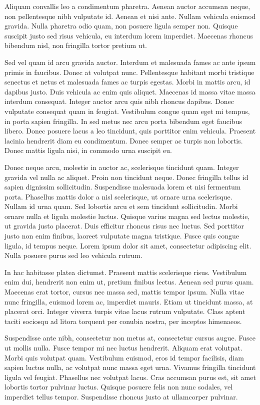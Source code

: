 Aliquam convallis leo a condimentum pharetra. Aenean auctor accumsan neque, non pellentesque nibh vulputate id. Aenean et nisi ante. Nullam vehicula euismod gravida. Nulla pharetra odio quam, non posuere ligula semper non. Quisque suscipit justo sed risus vehicula, eu interdum lorem imperdiet. Maecenas rhoncus bibendum nisl, non fringilla tortor pretium ut.

Sed vel quam id arcu gravida auctor. Interdum et malesuada fames ac ante ipsum primis in faucibus. Donec at volutpat nunc. Pellentesque habitant morbi tristique senectus et netus et malesuada fames ac turpis egestas. Morbi in mattis arcu, id dapibus justo. Duis vehicula ac enim quis aliquet. Maecenas id massa vitae massa interdum consequat. Integer auctor arcu quis nibh rhoncus dapibus. Donec vulputate consequat quam in feugiat. Vestibulum congue quam eget mi tempus, in porta sapien fringilla. In sed metus nec arcu porta bibendum eget faucibus libero. Donec posuere lacus a leo tincidunt, quis porttitor enim vehicula. Praesent lacinia hendrerit diam eu condimentum. Donec semper ac turpis non lobortis. Donec mattis ligula nisi, in commodo urna suscipit eu.

Donec neque arcu, molestie in auctor ac, scelerisque tincidunt quam. Integer gravida vel nulla ac aliquet. Proin non tincidunt neque. Donec fringilla tellus id sapien dignissim sollicitudin. Suspendisse malesuada lorem et nisi fermentum porta. Phasellus mattis dolor a nisl scelerisque, ut ornare urna scelerisque. Nullam id urna quam. Sed lobortis arcu et sem tincidunt sollicitudin. Morbi ornare nulla et ligula molestie luctus. Quisque varius magna sed lectus molestie, ut gravida justo placerat. Duis efficitur rhoncus risus nec luctus. Sed porttitor justo non enim finibus, laoreet vulputate magna tristique. Fusce quis congue ligula, id tempus neque. Lorem ipsum dolor sit amet, consectetur adipiscing elit. Nulla posuere purus sed leo vehicula rutrum.

In hac habitasse platea dictumst. Praesent mattis scelerisque risus. Vestibulum enim dui, hendrerit non enim ut, pretium finibus lectus. Aenean sed purus quam. Maecenas erat tortor, cursus nec massa sed, mattis tempor ipsum. Nulla vitae nunc fringilla, euismod lorem ac, imperdiet mauris. Etiam ut tincidunt massa, at placerat orci. Integer viverra turpis vitae lacus rutrum vulputate. Class aptent taciti sociosqu ad litora torquent per conubia nostra, per inceptos himenaeos.

Suspendisse ante nibh, consectetur non metus at, consectetur cursus augue. Fusce ut mollis nulla. Fusce tempor mi nec luctus hendrerit. Aliquam erat volutpat. Morbi quis volutpat quam. Vestibulum euismod, eros id tempor facilisis, diam sapien luctus nulla, ac volutpat nunc massa eget urna. Vivamus fringilla tincidunt ligula vel feugiat. Phasellus nec volutpat lacus. Cras accumsan purus est, sit amet lobortis tortor pulvinar luctus. Quisque posuere felis non nunc sodales, vel imperdiet tellus tempor. Suspendisse rhoncus justo at ullamcorper pulvinar.


